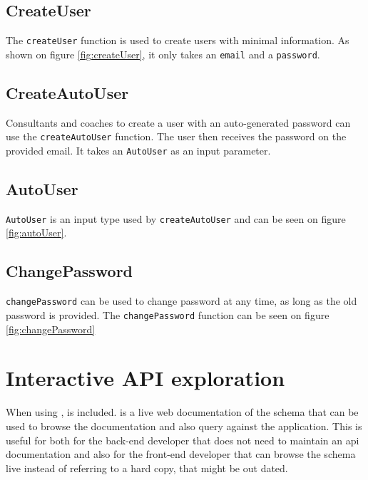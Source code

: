 \subsection{CreateUser}
\label{sec:createUser}
The \verb+createUser+ function is used to create users with minimal information. 
As shown on figure \ref{fig:createUser}, it only takes an \verb+email+ and a \verb+password+.

\subsection{CreateAutoUser}
\label{sec:createAutoUser}
Consultants and coaches to create a user with an auto-generated password can use the \verb+createAutoUser+ function.
The user then receives the password on the provided email.
It takes an \verb+AutoUser+ as an input parameter.

\subsection{AutoUser}
\verb+AutoUser+ is an input type used by \verb+createAutoUser+ and can be seen on figure \ref{fig:autoUser}.

\subsection{ChangePassword}
\label{sec:changePassword}
\verb+changePassword+ can be used to change password at any time, as long as the old password is provided.
The \verb+changePassword+ function can be seen on figure \ref{fig:changePassword}

\section{Interactive API exploration}
When using ,  is included.
 is a live web documentation of the schema that can be used to browse the documentation and also query against the application.
This is useful for both for the back-end developer that does not need to maintain an \gls{api} documentation and also for the front-end developer that can browse the schema live instead of referring to a hard copy, that might be out dated.

